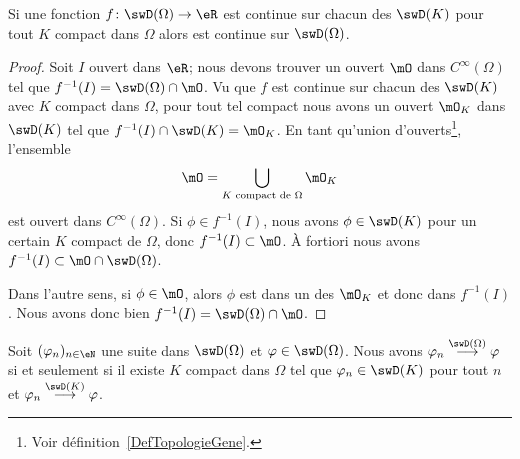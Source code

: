 \begin{lemma}   \label{LemWEGpemo}
	Si une fonction \( f\colon \swD(\Omega)\to \eR\) est continue sur chacun des \( \swD(K)\) pour tout \( K\) compact dans \( \Omega\) alors est continue sur \( \swD(\Omega)\).
\end{lemma}

\begin{proof}
	Soit \( I\) ouvert dans \( \eR\); nous devons trouver un ouvert \( \mO\) dans \(  C^{\infty}(\Omega)\) tel que \( f^{-1}(I)=\swD(\Omega)\cap\mO\). Vu que \( f\) est continue sur chacun des \( \swD(K)\) avec \( K\) compact dans \( \Omega\), pour tout tel compact nous avons un ouvert \( \mO_K\) dans \( \swD(K)\) tel que \( f^{-1}(I)\cap \swD(K)=\mO_K\). En tant qu'union d'ouverts\footnote{Voir définition~\ref{DefTopologieGene}.}, l'ensemble
	\begin{equation}
		\mO=\bigcup_{ K\text{ compact de } \Omega}\mO_K
	\end{equation}
	est ouvert dans \(  C^{\infty}(\Omega)\). Si \( \phi\in f^{-1}(I)\), nous avons \( \phi\in\swD(K)\) pour un certain \( K\) compact de \( \Omega\), donc \( f^{-1}(I)\subset\mO\). À fortiori nous avons \( f^{-1}(I)\subset\mO\cap\swD(\Omega)\).

	Dans l'autre sens, si \( \phi\in\mO\), alors \( \phi\) est dans un des \( \mO_K\) et donc dans \( f^{-1}(I)\). Nous avons donc bien \( f^{-1}(I)=\swD(\Omega)\cap \mO\).
\end{proof}

\begin{theorem}       \label{ThoXYADBZr}
	Soit \( (\varphi_n)_{n\in \eN}\) une suite dans \( \swD(\Omega)\) et \( \varphi\in\swD(\Omega)\). Nous avons \( \varphi_n\stackrel{\swD(\Omega)}{\longrightarrow}\varphi\) si et seulement si il existe \( K\) compact dans \( \Omega\) tel que \( \varphi_n\in\swD(K)\) pour tout \( n\) et \( \varphi_n\stackrel{\swD(K)}{\longrightarrow}\varphi\).
\end{theorem}

